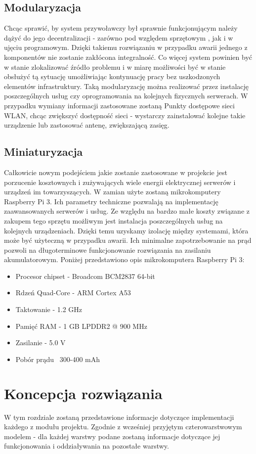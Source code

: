 \documentclass[12pt]{article} %
\begin{document}
\subsection{Modularyzacja} %
Chcąc sprawić, by system przywoławczy był sprawnie funkcjonującym należy dążyć do jego decentralizacji - zarówno pod względem sprzętowym , jak i w ujęciu programowym. Dzięki takiemu rozwiązaniu w przypadku awarii jednego z komponentów nie zostanie zakłócona integralność. Co więcej system powinien być w stanie zlokalizować źródło problemu i w miarę możliwości być w stanie obsłużyć tą sytuację umożliwiając kontynuację pracy bez uszkodzonych elementów infrastruktury.
Taką modularyzację można realizować przez instalację poszczególnych usług czy oprogramowania na kolejnych fizycznych serwerach. W przypadku wymiany informacji zastosowane zostaną Punkty dostępowe sieci WLAN, chcąc zwiększyć dostępność sieci - wystarczy zainstalować kolejne takie urządzenie lub zastosować antenę, zwiększającą zasięg. 
\subsection{Miniaturyzacja} %
Całkowicie nowym podejściem jakie zostanie zastosowane w projekcie jest porzucenie kosztownych i zużywających wiele energii elektrycznej serwerów i urządzeń im towarzyszących. W zamian użyte zostaną mikrokomputery Raspberry Pi 3. Ich parametry techniczne pozwalają na implementację zaawansowanych serwerów i usług. Ze względu na bardzo małe koszty związane z zakupem tego sprzętu możliwym jest instalacja poszczególnych usług na kolejnych urządzeniach. Dzięki temu uzyskamy izolację między systemami, która może być użyteczną w przypadku awarii. Ich minimalne zapotrzebowanie na prąd pozwoli na długoterminowe funkcjonowanie rozwiązania na zasilaniu akumulatorowym. Poniżej przedstawiono opis mikrokomputera Raspberry Pi 3:
\begin{itemize}
\item Procesor chipset - Broadcom BCM2837 64-bit
\item Rdzeń	Quad-Core - ARM Cortex A53
\item Taktowanie - 1.2 GHz
\item Pamięć RAM - 1 GB LPDDR2 @ 900 MHz
\item Zasilanie	- 5.0 V 
\item Pobór prądu ~300-400 mAh
\end{itemize}

\section{Koncepcja rozwiązania}
W tym rozdziale zostaną przedstawione informacje dotyczące implementacji każdego z modułu projektu. Zgodnie z wcześniej przyjętym czterowarstwowym modelem - dla każdej warstwy podane zostaną informacje dotyczące jej funkcjonowania i oddziaływania na pozostałe warstwy.
\end{document}
